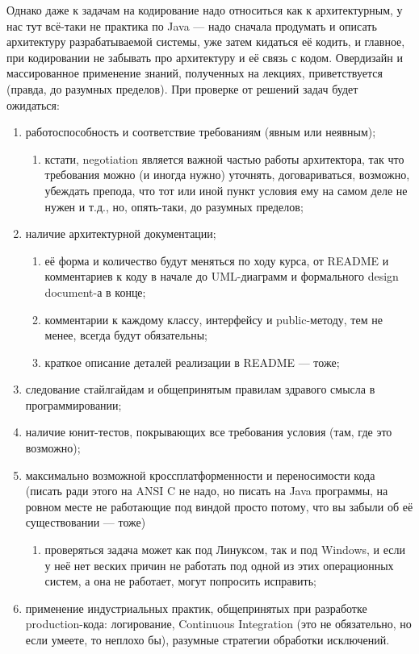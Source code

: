 \documentclass[a5paper]{article}
\begin{document}
Однако даже к задачам на кодирование надо относиться как к архитектурным, у нас тут всё-таки не практика по Java --- надо сначала продумать и описать архитектуру разрабатываемой системы, уже затем кидаться её кодить, и главное, при кодировании не забывать про архитектуру и её связь с кодом. Овердизайн и массированное применение знаний, полученных на лекциях, приветствуется (правда, до разумных пределов). При проверке от решений задач будет ожидаться:
\begin{enumerate}
	\item работоспособность и соответствие требованиям (явным или неявным);
  \begin{enumerate}
		\item кстати, negotiation является важной частью работы архитектора, так что требования можно (и иногда нужно) уточнять, договариваться, возможно, убеждать препода, что тот или иной пункт условия ему на самом деле не нужен и т.д., но, опять-таки, до разумных пределов;
  \end{enumerate}
	\item наличие архитектурной документации;
  \begin{enumerate}
		\item её форма и количество будут меняться по ходу курса, от README и комментариев к коду в начале до UML-диаграмм и формального design document-а в конце;
		\item комментарии к каждому классу, интерфейсу и public-методу, тем не менее, всегда будут обязательны;
		\item краткое описание деталей реализации в README --- тоже;
  \end{enumerate}
	\item следование стайлгайдам и общепринятым правилам здравого смысла в программировании;
	\item наличие юнит-тестов, покрывающих все требования условия (там, где это возможно);
	\item максимально возможной кроссплатформенности и переносимости кода (писать ради этого на ANSI C не надо, но писать на Java программы, на ровном месте не работающие под виндой просто потому, что вы забыли об её существовании --- тоже)
  \begin{enumerate}
		\item проверяться задача может как под Линуксом, так и под Windows, и если у неё нет веских причин не работать под одной из этих операционных систем, а она не работает, могут попросить исправить;
  \end{enumerate}	
	\item применение индустриальных практик, общепринятых при разработке production-кода: логирование, Continuous Integration (это не обязательно, но если умеете, то неплохо бы), разумные стратегии обработки исключений.
\end{enumerate}
\end{document}
